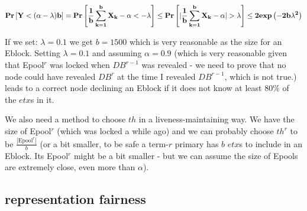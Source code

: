 $$\bf{Pr}\left[Y < (\alpha-\lambda)b\right]
=\bf{Pr}\left[ \frac{1}{b} \sum _{k=1}^b X_k - \alpha < -\lambda \right]
\leq \bf{Pr}\left[ | \frac{1}{b} \sum _{k=1}^b X_k - \alpha | > \lambda \right]
\leq 2 exp \left( -2b\lambda^2 \right)$$

If we set: $\lambda=0.1$ we get $b=1500$ which is very reasonable as the size for an Eblock. Setting $\lambda=0.1$ and assuming $\alpha=0.9$ (which is very reasonable given that Epool$^r$ was locked when $DB^{r-1}$ was revealed - we need to prove that no node could have revealed $DB^r$ at the time I revealed $DB^{r-1}$, which is not true.) leads to a correct node declining an Eblock if it does not know at least $80\%$ of the $etx$s in it.

We also need a method to choose $th$ in a liveness-maintaining way. We have the size of Epool$^r$ (which was locked a while ago) and we can probably choose $th^r$ to be $\frac{ |\text{Epool}^r| }{b}$ (or a bit smaller, to be safe a term-$r$ primary has $b$ $etx$s to include in an Eblock. Its Epool$^r$ might be a bit smaller - but we can assume the size of Epools are extremely close, even more than $\alpha$).

\subsection{representation fairness}



